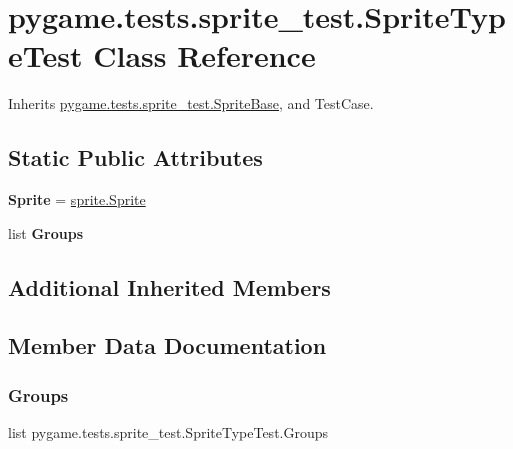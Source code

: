 \hypertarget{classpygame_1_1tests_1_1sprite__test_1_1_sprite_type_test}{}\section{pygame.\+tests.\+sprite\+\_\+test.\+Sprite\+Type\+Test Class Reference}
\label{classpygame_1_1tests_1_1sprite__test_1_1_sprite_type_test}


Inherits \hyperlink{classpygame_1_1tests_1_1sprite__test_1_1_sprite_base}{pygame.\+tests.\+sprite\+\_\+test.\+Sprite\+Base}, and Test\+Case.

\subsection*{Static Public Attributes}
\begin{DoxyCompactItemize}
\item 
\mbox{\label{classpygame_1_1tests_1_1sprite__test_1_1_sprite_type_test_a6e6c373fa8f2f4acac970b2c522c537c}} 
{\bfseries Sprite} = \hyperlink{classpygame_1_1sprite_1_1_sprite}{sprite.\+Sprite}
\item 
list {\bfseries Groups}
\end{DoxyCompactItemize}
\subsection*{Additional Inherited Members}


\subsection{Member Data Documentation}
\mbox{\label{classpygame_1_1tests_1_1sprite__test_1_1_sprite_type_test_a121ec064a3e4b7d84cceda840baa0535}} 
\subsubsection{\texorpdfstring{Groups}{Groups}}
{\footnotesize\ttfamily list pygame.\+tests.\+sprite\+\_\+test.\+Sprite\+Type\+Test.\+Groups\hspace{0.3cm}{\ttfamily [static]}}

